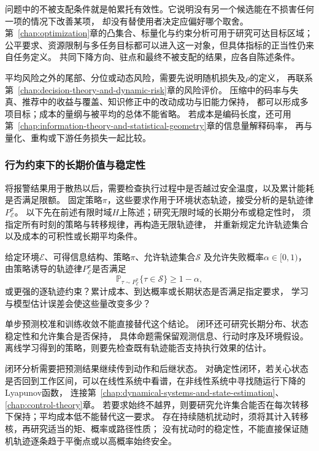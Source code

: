 问题中的不被支配条件就是帕累托有效性。它说明没有另一个候选能在不损害任何一项的情况下改善某项，
却没有替使用者决定应偏好哪个取舍。
第~\ref{chap:optimization}章的凸集合、标量化与约束分析可用于研究可达目标区域；
公平要求、资源限制与多任务目标都可以进入这一对象，但具体指标的正当性仍来自任务定义。
共同下降方向、驻点和最终不被支配的结果，应各自陈述条件。

平均风险之外的尾部、分位或动态风险，需要先说明随机损失及$\rho$的定义，
再联系第~\ref{chap:decision-theory-and-dynamic-risk}章的风险评价。
压缩中的码率与失真、推荐中的收益与覆盖、知识修正中的改动成功与旧能力保持，
都可以形成多项目标；成本的量纲与被平均的总体不能省略。
若成本是编码长度，还可用第~\ref{chap:information-theory-and-statistical-geometry}章的信息量解释码率，
再与量化、重构或下游任务损失一起比较。

\subsubsection{行为约束下的长期价值与稳定性}
\label{sec:future-analysis-closed-loop}

将报警结果用于散热以后，需要检查执行过程中是否越过安全温度，以及累计能耗是否满足限额。
固定策略$\pi$，这些要求作用于环境状态轨迹，接受分析的是轨迹律$P_{\mathcal E}^{\pi}$。
以下先在前述有限时域$H$上陈述；研究无限时域的长期分布或稳定性时，
须指定所有时刻的策略与转移规律，再构造无限轨迹律，
并重新规定允许轨迹集合以及成本的可积性或长期平均条件。

\begin{mathproblem}[闭环轨迹能否满足长期要求]
  \label{question:future-closed-loop}
  给定环境$\mathcal E$、可得信息结构、策略$\pi$、允许轨迹集合$\mathcal S$
  及允许失败概率$\alpha\in[0,1)$，
  由策略诱导的轨迹律$P_{\mathcal E}^{\pi}$是否满足
  \[
    \mathbb P_{\tau\sim P_{\mathcal E}^{\pi}}\{\tau\in\mathcal S\}
    \geq1-\alpha,
  \]
  或更强的逐轨迹约束？累计成本、到达概率或长期状态是否满足指定要求，
  学习与模型估计误差会使这些量改变多少？
\end{mathproblem}

单步预测校准和训练收敛不能直接替代这个结论。
闭环还可研究长期分布、状态稳定性和允许集合是否保持，
具体命题需保留观测信息、行动时序及环境假设。
离线学习得到的策略，则要先检查既有轨迹能否支持执行效果的估计。

闭环分析需要把预测结果继续传到动作和后继状态。
对确定性闭环，若关心状态是否回到工作区间，可以在线性系统中看谱，在非线性系统中寻找随运行下降的Lyapunov函数，
连接第~\ref{chap:dynamical-systems-and-state-estimation}、\ref{chap:control-theory}章。
若要求始终不越界，则要研究允许集合能否在每次转移下保持；平均成本低不能替代这一要求。
存在持续随机扰动时，须将其计入转移核，再研究适当的矩、概率或路径性质；
没有扰动时的稳定性，不能直接保证随机轨迹逐条趋于平衡点或以高概率始终安全。


